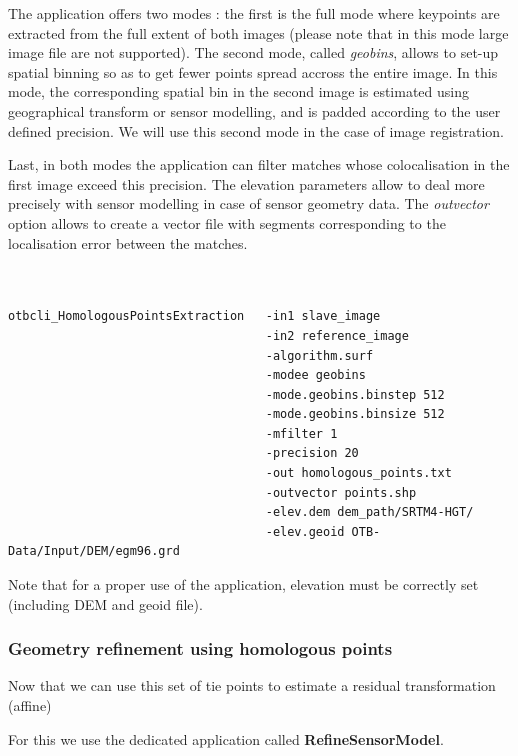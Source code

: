 The application offers two modes : the first is the full mode where keypoints
are extracted from the full extent of both images (please note that in this mode
large image file are not supported). The second mode, called \textit{geobins},
allows to set-up spatial binning so as to get fewer points spread accross the
entire image. In this mode, the corresponding spatial bin in the second image is
estimated using geographical transform or sensor modelling, and is padded
according to the user defined precision. We will use this second mode in the
case of image registration.

Last, in both modes the application can filter matches whose colocalisation in
the first image exceed this precision. The elevation parameters allow to deal
more precisely with sensor modelling in case of sensor geometry data. The
\textit{outvector} option allows to create a vector file with segments
corresponding to the localisation error between the matches.

\begin{verbatim}


otbcli_HomologousPointsExtraction   -in1 slave_image
                                    -in2 reference_image
                                    -algorithm.surf
                                    -modee geobins
                                    -mode.geobins.binstep 512
                                    -mode.geobins.binsize 512
                                    -mfilter 1
                                    -precision 20  
                                    -out homologous_points.txt
                                    -outvector points.shp
                                    -elev.dem dem_path/SRTM4-HGT/ 
                                    -elev.geoid OTB-Data/Input/DEM/egm96.grd

\end{verbatim}

Note that for a proper use of the application, elevation must be correctly set
(including DEM and geoid file).

\subsubsection{Geometry refinement using homologous points}

Now that we can use this set of tie points to estimate a residual transformation (affine)  

For this we use the dedicated application called \textbf{RefineSensorModel}. 

